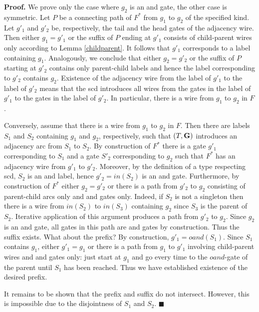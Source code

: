 \documentclass{llncs}
\begin{document}
{\bf Proof.}
We prove only the case where $g_2$ is an {\sc and} gate, the other case is symmetric. 
Let $P$ be a connecting path of $F^*$ from $g_1$ to $g_2$ of the specified kind. Let $g'_1$ and $g'_2$ be, respectively, the tail and the head gates of the adjacency wire. Then either 
$g_1=g'_1$ or the suffix of $P$ ending at $g'_1$ consists
of child-parent wires only according to Lemma \ref{childparent}.
It follows that $g'_1$ corresponds to a label containing $g_1$. Analogously, we conclude that either $g_2=g'_2$ or the suffix of $P$ starting at $g'_2$ contains only parent-child labels and hence the label corresponding to $g'_2$ contains $g_2$. Existence of the adjacency wire from the label of $g'_1$ to the label of $g'_2$ means that the {\sc scd} introduces all wires from the 
gates in the label of $g'_1$ to the gates in the label of $g'_2$. In particular, there is a wire from $g_1$ to $g_2$ in $F$. 

Conversely, assume that there is a wire from $g_1$ to $g_2$ in $F$. Then there are labels $S_1$ and $S_2$ containing 
$g_1$ and $g_2$, respectively, such that $(T,{\bf G})$ introduces an adjacency arc from $S_1$ to $S_2$. By construction of $F^*$ there is a gate $g'_1$ corresponding to $S_1$ and a gate $S'_2$ corresponding to $g_2$ such that $F^*$ has an adjacency wire from $g'_1$ to $g'_2$. Moreover, by the definition of a type respecting {\sc scd}, $S_2$ is
an {\sc and} label, hence $g'_2=in(S_2)$ is an {\sc and} gate. Furthermore, by construction of $F^*$
either $g_2=g'_2$ or there is a path from $g'_2$ to $g_2$ consisting of parent-child arcs only and {\sc and} gates only. Indeed, if $S_2$ is not a singleton then there is a wire from $in(S_2)$ to $in(S_3)$ containing $g_2$ since $S_3$ is the parent of $S_2$. Iterative application of this argument produces a path from $g'_2$ to $g_2$. Since $g_2$ is an {\sc and} gate, all gates in this path are 
{\sc and} gates by construction.  Thus the suffix exists. What about the prefix?
By construction, $g'_1=oand(S_1)$. Since $S_1$ contains $g_1$,
either $g'_1=g_1$ or there is a path from $g_1$ to $g'_1$ involving child-parent wires and {\sc and} gates only: just start at $g_1$ and go every time to the $oand$-gate of the parent
until $S_1$ has been reached. Thus we have established existence of the desired prefix.

It remains to be shown that the prefix and suffix do not intersect. However, this is impossible due to the disjointness of $S_1$ and $S_2$. 
$\blacksquare$
\end{document}
